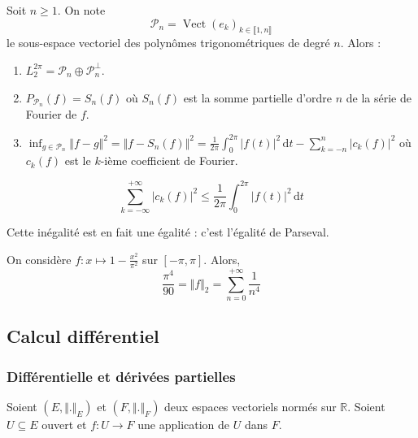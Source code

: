 
	\begin{corollary}
		Soit $n \geq 1$. On note \[ \mathcal{P}_n = \operatorname{Vect}(e_k)_{k \in \llbracket 1, n \rrbracket} \]
		le sous-espace vectoriel des polynômes trigonométriques de degré $n$. Alors :
		\begin{enumerate}[label=(\roman*)]
			\item $L_2^{2\pi} = \mathcal{P}_n \oplus \mathcal{P}_n^\perp$.
			\item $P_{\mathcal{P}_n}(f) = S_n(f)$
			où $S_n(f)$ est la somme partielle d'ordre $n$ de la série de Fourier de $f$.
			\item $\inf_{g \in \mathcal{P}_n} \Vert f-g \Vert^2 = \Vert f-S_n(f) \Vert^2 = \frac{1}{2\pi} \int_0^{2\pi} \vert f(t) \vert^2 \, \mathrm{d}t - \sum_{k=-n}^{n} \vert c_k(f) \vert^2$
			où $c_k(f)$ est le $k$-ième coefficient de Fourier.
		\end{enumerate}
	\end{corollary}

	\begin{application}
		\[ \sum_{k=-\infty}^{+\infty} \vert c_k(f) \vert^2 \leq \frac{1}{2\pi} \int_0^{2\pi} \vert f(t) \vert^2 \, \mathrm{d}t \]
	\end{application}

	\begin{remark}
		Cette inégalité est en fait une égalité : c'est l'égalité de Parseval.
	\end{remark}

	\begin{example}
		On considère $f : x \mapsto 1 - \frac{x^2}{\pi^2}$ sur $[-\pi, \pi]$. Alors,
		\[ \frac{\pi^4}{90} = \Vert f \Vert_2 = \sum_{n=0}^{+\infty} \frac{1}{n^4} \]
	\end{example}

	\subsection{Calcul différentiel}

	\subsubsection{Différentielle et dérivées partielles}


	Soient $(E, \Vert . \Vert_E)$ et $(F, \Vert . \Vert_F)$ deux espaces vectoriels normés sur $\mathbb{R}$. Soient $U \subseteq E$ ouvert et $f : U \rightarrow F$ une application de $U$ dans $F$.

